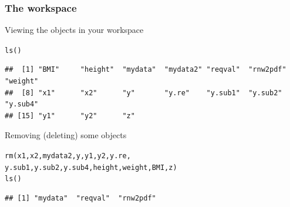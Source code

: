 \documentclass[color=usenames,dvipsnames]{beamer}\usepackage[]{graphicx}\usepackage[]{color}
\makeatletter
\newcommand{\hlstd}[1]{\textcolor[rgb]{0,0,0}{#1}}%
\newcommand{\hlkwd}[1]{\textcolor[rgb]{0.004,0.004,0.506}{#1}}%
\newenvironment{kframe}{%
 \def\at@end@of@kframe{}%
 \ifinner\ifhmode%
  \def\at@end@of@kframe{\end{minipage}}%
  \begin{minipage}{\columnwidth}%
 \fi\fi%
 \def\FrameCommand##1{\hskip\@totalleftmargin \hskip-\fboxsep
 \colorbox{shadecolor}{##1}\hskip-\fboxsep
     \hskip-\linewidth \hskip-\@totalleftmargin \hskip\columnwidth}%
 \MakeFramed {\advance\hsize-\width
   \@totalleftmargin\z@ \linewidth\hsize
   \@setminipage}}%
 {\par\unskip\endMakeFramed%
 \at@end@of@kframe}
\newenvironment{knitrout}{}{} %
\makeatother
\begin{document}
\begin{frame}[fragile]
  \frametitle{The workspace}
  Viewing the objects in your workspace
\begin{knitrout}\scriptsize
{}\color{fgcolor}\begin{kframe}
\begin{alltt}
\hlkwd{ls}\hlstd{()}
\end{alltt}
\begin{verbatim}
##  [1] "BMI"     "height"  "mydata"  "mydata2" "reqval"  "rnw2pdf" "weight" 
##  [8] "x1"      "x2"      "y"       "y.re"    "y.sub1"  "y.sub2"  "y.sub4" 
## [15] "y1"      "y2"      "z"
\end{verbatim}
\end{kframe}
\end{knitrout}
\pause \vfill
Removing (deleting) some objects
\begin{knitrout}\scriptsize
{}\color{fgcolor}\begin{kframe}
\begin{alltt}
\hlkwd{rm}\hlstd{(x1, x2, mydata2, y, y1, y2, y.re,}
   \hlstd{y.sub1, y.sub2, y.sub4, height, weight, BMI, z)}
\hlkwd{ls}\hlstd{()}
\end{alltt}
\begin{verbatim}
## [1] "mydata"  "reqval"  "rnw2pdf"
\end{verbatim}
\end{kframe}
\end{knitrout}
\end{frame}
\end{document}
